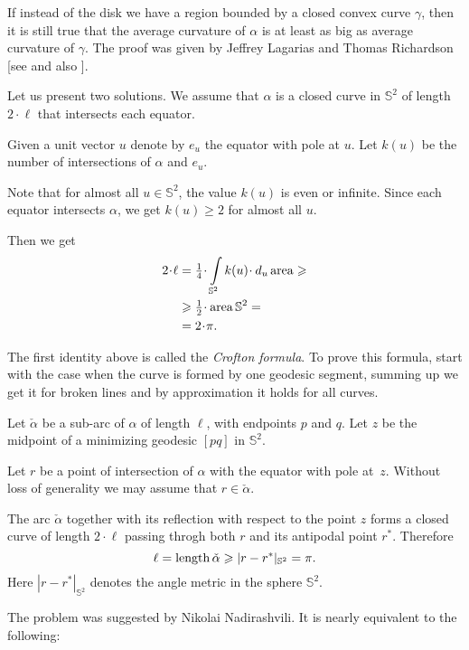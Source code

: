 If instead of the disk we have a region bounded by a closed convex curve $\gamma$, 
then it is still true that the average curvature of $\alpha$ is at least as big as average curvature of $\gamma$. 
The proof was given by Jeffrey Lagarias
and Thomas Richardson [see  and also ].


Let us present two solutions.
We assume that $\alpha$ is a closed curve in $\mathbb{S}^2$ of length $2\cdot\ell$ that intersects each equator.

Given a unit vector $u$ denote by $e_u$ the equator with pole at $u$.
Let $k(u)$ be the number of intersections
of $\alpha$ and $e_u$.

Note that for almost all $u\in \mathbb{S}^2$, the value $k(u)$ is even or infinite.
Since each equator intersects $\alpha$, we get $k(u)\ge 2$ for almost all $u$.

Then we get
\begin{align*}
2\cdot\ell&=\tfrac14\cdot\int\limits_{\mathbb{S}^2}k(u)\cdot\, d_u\area\ge 
\\
&\ge\tfrac12\cdot\area\mathbb{S}^2=
\\
&=2\cdot\pi.
\end{align*}

The first identity above is called the \emph{Crofton formula}.
To prove this formula, start with the case when the curve is formed by one geodesic segment,
summing up we get it for broken lines
and by approximation it holds for all curves.
\qeds

Let $\check\alpha$ be a sub-arc of $\alpha$ of length $\ell$, with endpoints $p$ and $q$. 
Let $z$ be the midpoint of a minimizing geodesic $[pq]$ in $\mathbb{S}^2$. 

Let $r$ be a point of intersection of $\alpha$ with the equator with pole at~$z$. 
Without loss of generality we may assume that $r\in\check\alpha$. 

The arc $\check\alpha$ together with its reflection with respect to the point $z$ forms a closed curve of length $2\cdot \ell$ passing throgh both $r$ and its antipodal point $r^{*}$.
Therefore 
\[\ell=\operatorname{\rm length} \check\alpha\geqslant |r-r^{*}|_{\mathbb S^2}=\pi.\]
Here $|r-r^{*}|_{\mathbb S^2}$ 
denotes the angle metric in the sphere $\mathbb S^2$.\qeds


The problem was suggested by Nikolai Nadirashvili.
It is nearly equivalent to the following: 

